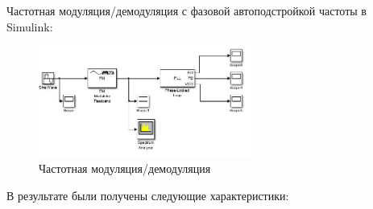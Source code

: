\documentclass[10pt,a4paper]{article}
\begin{document}
Частотная модуляция/демодуляция с фазовой автоподстройкой частоты в Simulink:
\begin{figure}[h]\centering
    \includegraphics[width=7cm]{sim_pll} 
    \caption{Частотная модуляция/демодуляция}\label{fig.sim_pll}
\end{figure}                                                                                                                                                                                                                                                                                                                                                                                                                                                                                                                                                                                                                                                                                                                                                                                                                                                                                                                                                                                                                                                                                                                                                                                                                                                                                                                                                                                                                                                                       

В результате были получены следующие характеристики:
\end{document}
